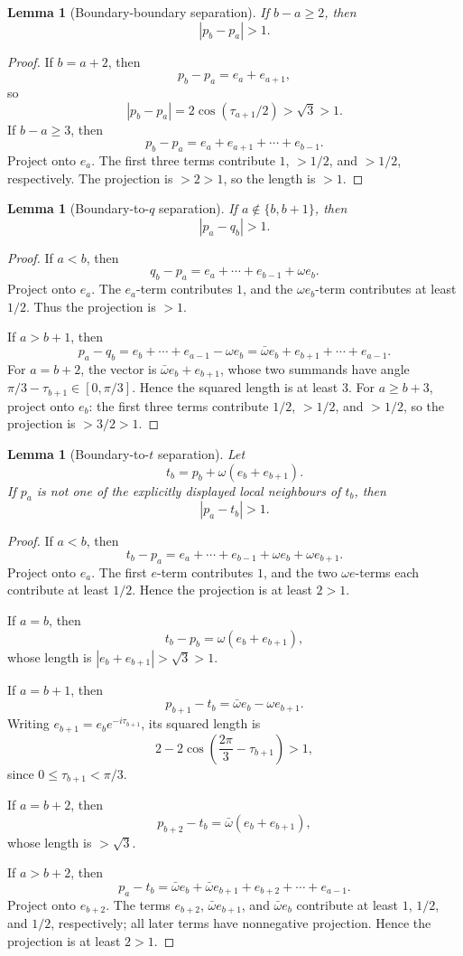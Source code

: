\documentclass[11pt]{article}
\newtheorem{lemma}[theorem]{Lemma}
\begin{document}
\begin{lemma}[Boundary-boundary separation]\label{lem:bb}
If $b-a\ge2$, then
\[
 |p_b-p_a|>1.
\]
\end{lemma}

\begin{proof}
If $b=a+2$, then
\[
 p_b-p_a=e_a+e_{a+1},
\]
so
\[
 |p_b-p_a|=2\cos(\tau_{a+1}/2)>\sqrt3>1.
\]
If $b-a\ge3$, then
\[
 p_b-p_a=e_a+e_{a+1}+\cdots+e_{b-1}.
\]
Project onto $e_a$. The first three terms contribute $1$, $>1/2$, and $>1/2$, respectively. The projection is $>2>1$, so the length is $>1$.
\end{proof}

\begin{lemma}[Boundary-to-$q$ separation]\label{lem:bq}
If $a\notin\{b,b+1\}$, then
\[
 |p_a-q_b|>1.
\]
\end{lemma}

\begin{proof}
If $a<b$, then
\[
 q_b-p_a=e_a+\cdots+e_{b-1}+\omega e_b.
\]
Project onto $e_a$. The $e_a$-term contributes $1$, and the $\omega e_b$-term contributes at least $1/2$. Thus the projection is $>1$.

If $a>b+1$, then
\[
 p_a-q_b=e_b+\cdots+e_{a-1}-\omega e_b
       =\bar\omega e_b+e_{b+1}+\cdots+e_{a-1}.
\]
For $a=b+2$, the vector is $\bar\omega e_b+e_{b+1}$, whose two summands have angle $\pi/3-\tau_{b+1}\in[0,\pi/3]$. Hence the squared length is at least $3$. For $a\ge b+3$, project onto $e_b$: the first three terms contribute $1/2$, $>1/2$, and $>1/2$, so the projection is $>3/2>1$.
\end{proof}

\begin{lemma}[Boundary-to-$t$ separation]\label{lem:bt}
Let
\[
 t_b=p_b+\omega(e_b+e_{b+1}).
\]
If $p_a$ is not one of the explicitly displayed local neighbours of $t_b$, then
\[
 |p_a-t_b|>1.
\]
\end{lemma}

\begin{proof}
If $a<b$, then
\[
 t_b-p_a=e_a+\cdots+e_{b-1}+\omega e_b+\omega e_{b+1}.
\]
Project onto $e_a$. The first $e$-term contributes $1$, and the two $\omega e$-terms each contribute at least $1/2$. Hence the projection is at least $2>1$.

If $a=b$, then
\[
 t_b-p_b=\omega(e_b+e_{b+1}),
\]
whose length is $|e_b+e_{b+1}|>\sqrt3>1$.

If $a=b+1$, then
\[
 p_{b+1}-t_b=\bar\omega e_b-\omega e_{b+1}.
\]
Writing $e_{b+1}=e_be^{-i\tau_{b+1}}$, its squared length is
\[
 2-2\cos\left(\frac{2\pi}{3}-\tau_{b+1}\right)>1,
\]
since $0\le\tau_{b+1}<\pi/3$.

If $a=b+2$, then
\[
 p_{b+2}-t_b=\bar\omega(e_b+e_{b+1}),
\]
whose length is $>\sqrt3$.

If $a>b+2$, then
\[
 p_a-t_b=\bar\omega e_b+\bar\omega e_{b+1}+e_{b+2}+\cdots+e_{a-1}.
\]
Project onto $e_{b+2}$. The terms $e_{b+2}$, $\bar\omega e_{b+1}$, and $\bar\omega e_b$ contribute at least $1$, $1/2$, and $1/2$, respectively; all later terms have nonnegative projection. Hence the projection is at least $2>1$.
\end{proof}
\end{document}
